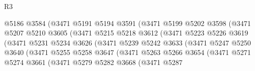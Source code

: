 \begin{lexlean}{R3}
\begin{coremodule}
                                @5186
                                @3584
                                (@3471
                                  @5191
                                  @5194
                                  @3591
                                  (@3471
                                    @5199
                                    @5202
                                    @3598
                                    (@3471
                                      @5207
                                      @5210
                                      @3605
                                      (@3471
                                        @5215
                                        @5218
                                        @3612
                                        (@3471
                                          @5223
                                          @5226
                                          @3619
                                          (@3471
                                            @5231
                                            @5234
                                            @3626
                                            (@3471
                                              @5239
                                              @5242
                                              @3633
                                              (@3471
                                                @5247
                                                @5250
                                                @3640
                                                (@3471
                                                  @5255
                                                  @5258
                                                  @3647
                                                  (@3471
                                                    @5263
                                                    @5266
                                                    @3654
                                                    (@3471
                                                      @5271
                                                      @5274
                                                      @3661
                                                      (@3471
                                                        @5279
                                                        @5282
                                                        @3668
                                                        (@3471
                                                          @5287

\end{coremodule}
\end{lexlean}
